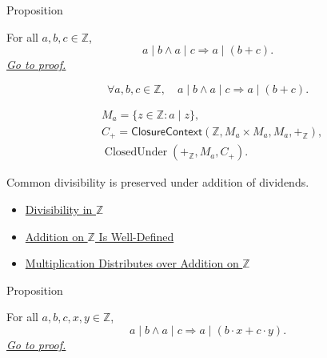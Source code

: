 \begin{propositionbox}{Proposition}
\begin{proposition}
\label{prop:divisibility-compatible-with-addition-on-z}
For all $a,b,c\in\mathbb{Z}$,
\[
a\mid b\land a\mid c \Longrightarrow a\mid(b+c).
\]
\hyperref[prf:divisibility-compatible-with-addition-on-z]{\textit{Go to proof.}}
\end{proposition}
\end{propositionbox}

\begin{remark*}
\[
\forall a,b,c\in\mathbb{Z},\quad
a\mid b\land a\mid c \Longrightarrow a\mid(b+c).
\]
\end{remark*}

\begin{remark*}
\[
\begin{aligned}
&M_a=\{z\in\mathbb{Z}:a\mid z\},\\
&C_{+}=\mathsf{ClosureContext}(\mathbb{Z},M_a\times M_a,M_a,+_{\mathbb{Z}}),\\
&\operatorname{ClosedUnder}(+_{\mathbb{Z}},M_a,C_{+}).
\end{aligned}
\]
\end{remark*}

\begin{remark*}[Interpretation]
Common divisibility is preserved under addition of dividends.
\end{remark*}

\begin{dependencies}
\begin{itemize}
  \item \hyperref[def:divisibility-in-z]{Divisibility in $\mathbb{Z}$}

  \item \hyperref[thm:addition-on-z-well-defined]{Addition on $\mathbb{Z}$ Is Well-Defined}
  \item \hyperref[thm:multiplication-distributes-over-addition-on-z]{Multiplication Distributes over Addition on $\mathbb{Z}$}
\end{itemize}
\end{dependencies}

\begin{propositionbox}{Proposition}
\begin{proposition}
\label{prop:divisibility-respects-linear-combinations-on-z}
For all $a,b,c,x,y\in\mathbb{Z}$,
\[
a\mid b\land a\mid c \Longrightarrow a\mid(b\cdot x+c\cdot y).
\]
\hyperref[prf:divisibility-respects-linear-combinations-on-z]{\textit{Go to proof.}}
\end{proposition}
\end{propositionbox}

